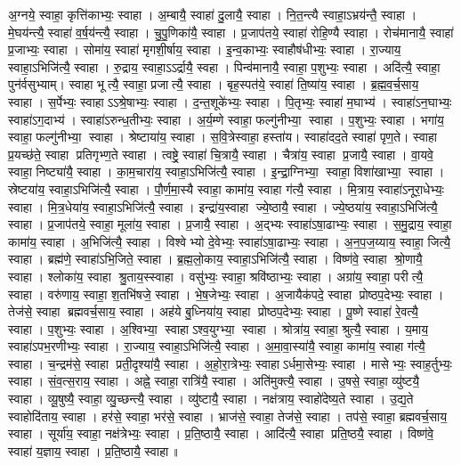 अ॒ग्नये॒ स्वाहा॒ कृत्ति॑काभ्यः॒ स्वाहा।
अ॒म्बायै॒ स्वाहा॑ दु॒लायै॒ स्वाहा।
नि॒त॒न्त्यै स्वाहा॒ऽभ्रय॑न्तै॒ स्वाहा।
मे॒घय॑न्त्यै॒ स्वाहा॑ व॒र्ष॒य॑न्त्यै॒ स्वाहा।
चु॒पु॒णिका॑यै॒ स्वाहा।
प्र॒जाप॑तये॒ स्वाहा॑ रोहि॒ण्यै स्वाहा।
रोच॑मानायै॒ स्वाहा॑ प्र॒जाभ्यः॒ स्वाहा।
सोमा॑य॒ स्वाहा॑ मृगशी॒र्षाय॒ स्वाहा।
इ॒न्व॒काभ्यः॒ स्वाहौष॑धीभ्यः॒ स्वाहा।
रा॒ज्याय॒ स्वाहा॒ऽभिजि॑त्यै॒ स्वाहा।
रु॒द्राय॒ स्वाहा॒ऽऽर्द्रायै॒ स्वहा।
पिन्व॑मानायै॒ स्वाहा॒ प॒शुभ्यः॒ स्वाहा।
अदि॑त्यै॒ स्वाहा॒ पुन॑र्वसुभ्याम्।
स्वाहा भूत्यै॒ स्वाहा॒ प्रजात्यै॒ स्वाहा।
बृह॒स्पत॑ये॒ स्वाहा॑ ति॒ष्या॑य॒ स्वाहा।
ब्र॒ह्म॒व॒र्च॒साय॒ स्वाहा।
स॒र्पेभ्यः॒ स्वाहाऽऽश्रे॒षाभ्यः॒ स्वाहा।
द॒न्त॒शूके॑भ्यः॒ स्वाहा।
पि॒तृभ्यः॒ स्वाहा॑ म॒घाभ्य॑।
स्वाहा॑ऽन॒घाभ्यः॒ स्वाहा॑ऽग॒दाभ्य॑।
स्वाहा॑ऽरुन्ध॒तीभ्यः॒ स्वाहा।
अ॒र्य॒म्णे स्वाहा॒ फल्गु॑नीभ्या॒ स्वाहा।
प॒शुभ्यः॒ स्वाहा।
भगा॑य॒ स्वाहा॒ फल्गु॑नीभ्या॒ स्वाहा।
श्रेष्टाया॑य॒ स्वाहा।
स॒वि॒त्रेस्वाहा॒ हस्ता॑य।
स्वाहा॑दद॒ते स्वाहा॑ पृण॒ते।
स्वाहा प्र॒यच्छ॑ते॒ स्वाहा प्रतिगृभ्ण॒ते स्वाहा।
त्वष्ट्रे॒ स्वाहा॑ चि॒त्रायै॒ स्वाहा।
चैत्रा॑य॒ स्वाहा प्र॒जायै॒ स्वाहा।
वा॒यवे॒ स्वाहा॒ निष्ट्या॑यै॒ स्वाहा।
का॒म॒चारा॑य॒ स्वाहा॒ऽभिजि॑त्यै॒ स्वाहा।
इ॒न्द्रा॒ग्निभ्या॒ स्वाहा॒ विशा॑खाभ्या॒ स्वाहा।
स्रेष्टया॑य॒ स्वाहा॒ऽभिजि॑त्यै॒ स्वाहा।
पौ॒र्ण॒मा॒स्यै स्वाहा॒ कामा॑य॒ स्वाहा ग॑त्यै॒ स्वाहा।
मि॒त्राय॒ स्वाहा॑ऽनूरा॒धेभ्यः॒ स्वाहा।
मि॒त्र॒धेया॑य॒ स्वाहा॒ऽभिजि॑त्यै॒ स्वाहा।
इन्द्रा॑य॒स्वाहा ज्ये॒ष्ठायै॒ स्वाहा।
ज्ये॒ष्ठया॑य॒ स्वाहा॒ऽभिजि॑त्यै॒ स्वाहा।
प्र॒जाप॑तये॒ स्वाहा॒ मूला॑य॒ स्वाहा।
प्र॒जायै॒ स्वाहा।
अ॒द्भ्यः स्वाहा॑ऽषा॒ढाभ्यः॒ स्वाहा।
स॒मु॒द्राय॒ स्वाहा॒ कामा॑य॒ स्वाहा।
अ॒भिजि॑त्यै॒ स्वाहा।
विश्वेभ्यो दे॒वेभ्यः॒ स्वाहा॑ऽषा॒ढाभ्यः॒ स्वाहा।
अ॒न॒प॒ज॒य्याय॒ स्वाहा॒ जित्यै॒ स्वाहा।
ब्रह्म॑णे॒ स्वाहा॑ऽभि॒जिते॒ स्वाहा।
ब्र॒ह्म॒लो॒काय॒ स्वाहा॒ऽभिजि॑त्यै॒ स्वाहा।
विष्ण॑वे॒ स्वाहा श्रो॒णायै॒ स्वाहा।
श्लोका॑य॒ स्वाहा श्रु॒ताय॒स्स्वाहा।
वसु॑भ्यः॒ स्वाहा॒ श्रवि॑ष्ठाभ्यः॒ स्वाहा।
अग्रा॑य॒ स्वाहा॒ परीत्यै॒ स्वाहा।
वरु॑णाय॒ स्वाहा॒ श॒तभि॑षजे॒ स्वाहा।
भे॒ष॒जेभ्यः॒ स्वाहा।
अ॒जायैक॑पदे॒ स्वाहा प्रोष्ठप॒देभ्यः॒ स्वाहा।
तेज॑से॒ स्वाहा ब्रह्मवर्च॒साय॒ स्वाहा।
अह॑ये बु॒ध्निया॑य॒ स्वाहा प्रोष्ठप॒देभ्यः॒ स्वाहा।
पू॒ष्णे स्वाहा॑ रे॒वत्यै॒ स्वाहा।
प॒शुभ्यः॒ स्वाहा।
अ॒श्विभ्या॒ स्वाहाऽश्व॒युग्भ्या॒ स्वाहा।
श्रोत्रा॑य॒ स्वाहा॒ श्रुत्यै॒ स्वाहा।
य॒माय॒ स्वाहा॑ऽपभ॒रणीभ्यः॒ स्वाहा।
रा॒ज्याय॒ स्वाहा॒ऽभिजि॑त्यै॒ स्वाहा।
अ॒मा॒वा॒स्या॑यै॒ स्वाहा॒ कामा॑य॒ स्वाहा ग॑त्यै॒ स्वाहा।
च॒न्द्रम॑से॒ स्वाहा प्रती॒दृश्या॑यै॒ स्वाहा।
अ॒हो॒रा॒त्रेभ्यः॒ स्वाहाऽर्धमा॒सेभ्यः॒ स्वाहा।
मासेभ्यः॒ स्वाह॒र्तुभ्यः॒ स्वाहा।
सं॒व॒त्स॒राय॒ स्वाहा।
अह्ने॒ स्वाहा॒ रात्रि॑यै॒ स्वाहा।
अति॑मुक्त्यै॒ स्वाहा।
उ॒षसे॒ स्वाहा॒ व्यु॑ष्टयै॒ स्वाहा।
व्यू॒षुष्यै॒ स्वाहा॒ व्यु॒च्छन्त्यै॒ स्वाहा।
व्यु॑ष्टायै॒ स्वाहा।
नक्ष॑त्राय॒ स्वाहो॑देष्य॒ते स्वाहा।
उ॒द्य॒ते स्वाहोदि॑ताय॒ स्वाहा।
हर॑से॒ स्वाहा॒ भर॑से॒ स्वाहा।
भ्राज॑से॒ स्वाहा॒ तेज॑से॒ स्वाहा।
तप॑से॒ स्वाहा॒ ब्रह्मवर्च॒साय॒ स्वाहा।
सूर्या॑य॒ स्वाहा॒ नक्ष॑त्रेभ्यः॒ स्वाहा।
प्र॒ति॒ष्ठायै॒ स्वाहा।
आदि॑त्यै॒ स्वाहा प्रति॒ष्ठयै॒ स्वाहा।
विष्ण॑वे॒ स्वाहा॑ य॒ज्ञाय॒ स्वाहा।
प्र॒ति॒ष्ठायै॒ स्वाहा॥


